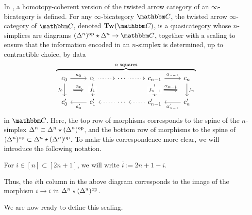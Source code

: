 \documentclass[main.tex]{subfiles}
\begin{document}
In \cite{garcia2020enhanced}, a homotopy-coherent version of the twisted arrow category of an $\infty$-bicategory is defined. For any $\infty$-bicategory $\CC$, the twisted arrow $\infty$-category of $\CC$, denoted $\Tw(\CC)$, is a quasicategory whose $n$-simplices are diagrams $(\Delta^{n})\op \star \Delta^{n} \to \CC$, together with a scaling to ensure that the information encoded in an $n$-simplex is determined, up to contractible choice, by data
\begin{equation*}
  \overbrace{
    \begin{tikzcd}[ampersand replacement=\&]
      c_{0}
      \arrow[r, "a_{0}"]
      \arrow[d, "f_{0}"{swap}, ""{name=L1}]
      \& c_{1}
      \arrow[d, "f_{1}"{description}, ""{swap, name=R1}]
      \arrow[r, dotted]
      \& \cdots
      \arrow[r, dotted]
      \& c_{n-1}
      \arrow[r, "a_{n-1}"]
      \arrow[d, "f_{n-1}"{description}, ""{name=Ln}]
      \& c_{n}
      \arrow[d, "f_{n}", ""{swap, name=Rn}]
      \\
      c'_{0}
      \& c'_{1}
      \arrow[l, "a'_{0}"]
      \& \cdots
      \arrow[l, dotted]
      \& c'_{n-1}
      \arrow[l, dotted]
      \& c'_{n}
      \arrow[l, "a'_{n-1}"]
      \arrow[from=L1, to=R1, Rightarrow, "\alpha_{0}", shorten=2ex]
      \arrow[from=Ln, to=Rn, Rightarrow, "\alpha_{n-1}", shorten=2ex]
    \end{tikzcd}
  }^{n\text{ squares}}
\end{equation*}
in $\CC$. Here, the top row of morphisms corresponds to the spine of the $n$-simplex $\Delta^{n} \subset \Delta^{n} \star (\Delta^{n})^{\mathrm{op}}$, and the bottom row of morphisms to the spine of $(\Delta^{n})^{\mathrm{op}} \subset \Delta^{n} \star (\Delta^{n})^{\mathrm{op}}$. To make this correspondence more clear, we will introduce the following notation.

\begin{notation}
  For $i \in [n] \subset [2n+1]$, we will write $\overline{i} := 2n+1-i$.
\end{notation}

Thus, the $i$th column in the above diagram corresponds to the image of the morphism $i \to \overline{i}$ in $\Delta^{n} \star (\Delta^{n})^{\mathrm{op}}$.

We are now ready to define this scaling.
\end{document}
